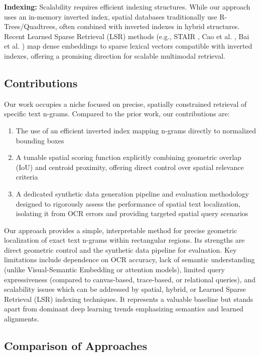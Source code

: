 \documentclass[manuscript,screen]{acmart}
\begin{document}
\textbf{Indexing:} Scalability requires efficient indexing structures. While our approach uses an in-memory inverted index, spatial databases traditionally use R-Trees/Quadtrees, often combined with inverted indexes in hybrid structures. Recent Learned Sparse Retrieval (LSR) methods (e.g., STAIR \cite{Chen23}, Cao et al. \cite{Cao23}, Bai et al. \cite{Bai24}) map dense embeddings to sparse lexical vectors compatible with inverted indexes, offering a promising direction for scalable multimodal retrieval.

\subsection{Contributions}

Our work occupies a niche focused on precise, spatially constrained retrieval of specific text n-grams. Compared to the prior work, our contributions are:

\begin{enumerate}
    \item The use of an efficient inverted index mapping n-grams directly to normalized bounding boxes
    \item A tunable spatial scoring function explicitly combining geometric overlap (IoU) and centroid proximity, offering direct control over spatial relevance criteria
    \item A dedicated synthetic data generation pipeline and evaluation methodology designed to rigorously assess the performance of spatial text localization, isolating it from OCR errors and providing targeted spatial query scenarios
\end{enumerate}

Our approach provides a simple, interpretable method for precise geometric localization of exact text n-grams within rectangular regions. Its strengths are direct geometric control and the synthetic data pipeline for evaluation. Key limitations include dependence on OCR accuracy, lack of semantic understanding (unlike Visual-Semantic Embedding or attention models), limited query expressiveness (compared to canvas-based, trace-based, or relational queries), and scalability issues which can be addressed by spatial, hybrid, or Learned Sparse Retrieval (LSR) indexing techniques. It represents a valuable baseline but stands apart from dominant deep learning trends emphasizing semantics and learned alignments.

\subsection{Comparison of Approaches}
\end{document}
